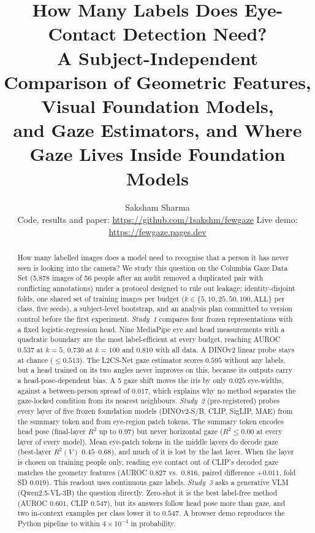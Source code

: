 \documentclass[10pt,twocolumn]{article}
\title{\Large\bfseries How Many Labels Does Eye-Contact Detection Need?\\[2pt]
\large A Subject-Independent Comparison of Geometric Features, Visual Foundation Models,\\ and Gaze Estimators, and Where Gaze Lives Inside Foundation Models}
\author{Saksham Sharma\\\small Code, results and paper: \url{https://github.com/1sakshm/fewgaze} \quad Live demo: \url{https://fewgaze.pages.dev}}
\date{}
\begin{document}
\maketitle

\begin{abstract}
\noindent
How many labelled images does a model need to recognise that a person it has never seen is looking into the
camera? We study this question on the Columbia Gaze Data Set (5{,}878 images of 56 people after an audit removed a
duplicated pair with conflicting annotations) under a protocol designed to rule out leakage: identity-disjoint folds,
one shared set of training images per budget ($k\in\{5,10,25,50,100,\mathrm{ALL}\}$ per class, five seeds), a
subject-level bootstrap, and an analysis plan committed to version control before the first experiment.
\emph{Study~1} compares four frozen representations with a fixed logistic-regression head. Nine MediaPipe eye and
head measurements with a quadratic boundary are the most label-efficient at every budget, reaching AUROC $0.537$ at
$k{=}5$, $0.730$ at $k{=}100$ and $0.810$ with all data. A DINOv2 linear probe stays at chance ($\le 0.513$). The
L2CS-Net gaze estimator scores $0.595$ without any labels, but a head trained on its two angles never improves on
this, because its outputs carry a head-pose-dependent bias. A 5\textdegree{} gaze shift moves the iris by only
$0.025$ eye-widths, against a between-person spread of $0.017$, which explains why no method separates the gaze-locked
condition from its nearest neighbours.
\emph{Study~2} (pre-registered) probes every layer of five frozen foundation models (DINOv2-S/B, CLIP, SigLIP, MAE)
from the summary token and from eye-region patch tokens. The summary token encodes head pose (final-layer $R^2$ up to $0.97$) but never horizontal gaze ($R^2{\le}0.00$ at every layer of every model). Mean eye-patch tokens in the middle layers do decode gaze (best-layer $R^2(V)$ $0.45$--$0.68$), and much of it is lost by the last layer. When the layer is chosen on training people only, reading eye contact out of CLIP's decoded gaze matches the geometry features (AUROC $0.827$ vs.~$0.816$, paired difference $+0.011$, fold SD $0.019$). This readout uses continuous gaze labels.
\emph{Study~3} asks a generative VLM (Qwen2.5-VL-3B) the question directly. Zero-shot it is the best label-free method (AUROC $0.601$, CLIP $0.547$), but its answers follow head pose more than gaze, and two in-context examples per class lower it to $0.547$.
A browser demo reproduces the Python pipeline to within $4\times10^{-4}$ in probability.
\end{abstract}
\end{document}
